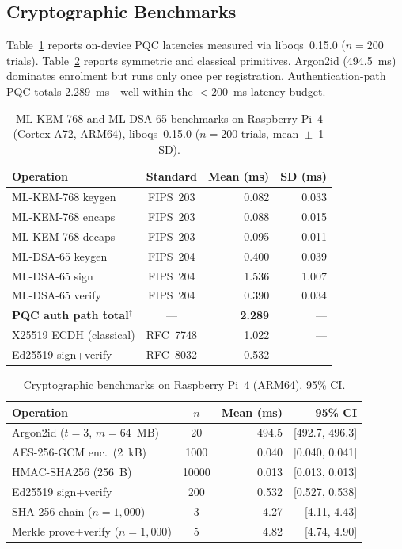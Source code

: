 \documentclass[submission]{sacjsub}
\begin{document}
\subsection{Cryptographic Benchmarks}

Table~\ref{tab:pqc_benchmarks} reports on-device PQC latencies
measured via liboqs~0.15.0 (\(n{=}200\) trials). Table~\ref{tab:crypto}
reports symmetric and classical primitives. Argon2id (494.5~ms)
dominates enrolment but runs only once per registration.
Authentication-path PQC totals 2.289~ms---well within the \(<200\)~ms
latency budget.

\begin{table}[t]
\caption{ML-KEM-768 and ML-DSA-65 benchmarks on Raspberry Pi~4
  (Cortex-A72, ARM64), liboqs~0.15.0 (\(n{=}200\) trials,
  mean~$\pm$~1\,SD).}
\label{tab:pqc_benchmarks}
\begin{tabular}{|l|c|r|r|}
  \hline
  Operation & Standard & Mean (ms) & SD (ms) \\
  \hline
  ML-KEM-768 keygen   & FIPS~203 & 0.082 & 0.033 \\
  ML-KEM-768 encaps   & FIPS~203 & 0.088 & 0.015 \\
  ML-KEM-768 decaps   & FIPS~203 & 0.095 & 0.011 \\
  ML-DSA-65 keygen    & FIPS~204 & 0.400 & 0.039 \\
  ML-DSA-65 sign      & FIPS~204 & 1.536 & 1.007 \\
  ML-DSA-65 verify    & FIPS~204 & 0.390 & 0.034 \\
  \hline
  \textbf{PQC auth path total}$^\dagger$ & --- & \textbf{2.289} & --- \\
  \hline
  X25519 ECDH (classical) & RFC~7748 & 1.022 & --- \\
  Ed25519 sign+verify     & RFC~8032 & 0.532 & --- \\
  \hline
\end{tabular}
\end{table}

\begin{table}[t]
\caption{Cryptographic benchmarks on Raspberry Pi~4 (ARM64), 95\% CI.}
\label{tab:crypto}
\begin{tabular}{|l|c|r|r|}
  \hline
  Operation & \(n\) & Mean (ms) & 95\% CI \\
  \hline
  Argon2id (\(t{=}3\), \(m{=}64\)~MB) & 20    & 494.5 & [492.7, 496.3] \\
  AES-256-GCM enc.\ (2~kB)            & 1000  & 0.040 & [0.040, 0.041] \\
  HMAC-SHA256 (256~B)                  & 10000 & 0.013 & [0.013, 0.013] \\
  Ed25519 sign+verify                  & 200   & 0.532 & [0.527, 0.538] \\
  SHA-256 chain (\(n{=}1{,}000\))     & 3     & 4.27  & [4.11, 4.43]   \\
  Merkle prove+verify (\(n{=}1{,}000\))& 5    & 4.82  & [4.74, 4.90]   \\
  \hline
\end{tabular}
\end{table}
\end{document}
